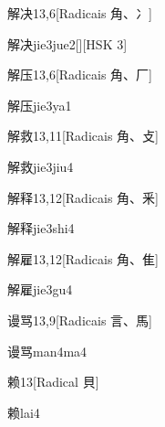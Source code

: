 \begin{entry}{解决}{13,6}[Radicais ⾓、⼎]
  \begin{phonetics}{解决}{jie3jue2}[][HSK 3]
  \end{phonetics}
\end{entry}

\begin{entry}{解压}{13,6}[Radicais ⾓、⼚]
  \begin{phonetics}{解压}{jie3ya1}
  \end{phonetics}
\end{entry}

\begin{entry}{解救}{13,11}[Radicais ⾓、⽁]
  \begin{phonetics}{解救}{jie3jiu4}
  \end{phonetics}
\end{entry}

\begin{entry}{解释}{13,12}[Radicais ⾓、⾤]
  \begin{phonetics}{解释}{jie3shi4}
  \end{phonetics}
\end{entry}

\begin{entry}{解雇}{13,12}[Radicais ⾓、⾫]
  \begin{phonetics}{解雇}{jie3gu4}
  \end{phonetics}
\end{entry}

\begin{entry}{谩骂}{13,9}[Radicais ⾔、⾺]
  \begin{phonetics}{谩骂}{man4ma4}
  \end{phonetics}
\end{entry}

\begin{entry}{赖}{13}[Radical ⾙]
  \begin{phonetics}{赖}{lai4}
  \end{phonetics}
\end{entry}

